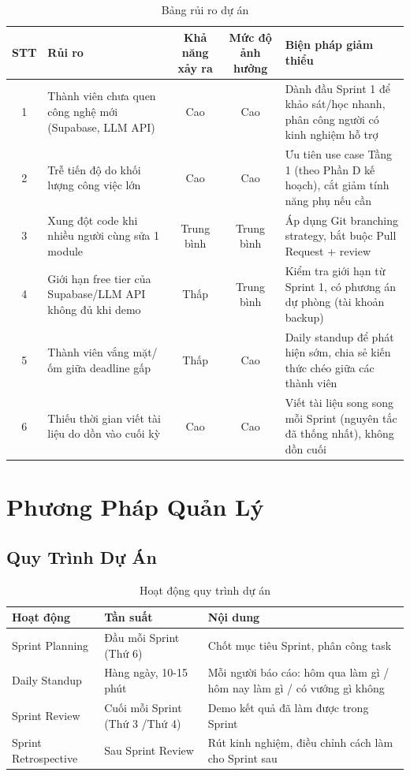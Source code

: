 \begin{table}[H]
  \centering
  \begin{tabularx}{\textwidth}{|c|>{\raggedright\arraybackslash}X|c|c|>{\raggedright\arraybackslash}X|}
    \hline
    \textbf{STT} & \textbf{Rủi ro} & \textbf{Khả năng xảy ra} & \textbf{Mức độ ảnh hưởng} & \textbf{Biện pháp giảm thiểu} \\
    \hline
    1 & Thành viên chưa quen công nghệ mới (Supabase, LLM API) & Cao & Cao & Dành đầu Sprint 1 để khảo sát/học nhanh, phân công người có kinh nghiệm hỗ trợ \\ \hline
    2 & Trễ tiến độ do khối lượng công việc lớn & Cao & Cao & Ưu tiên use case Tầng 1 (theo Phần D kế hoạch), cắt giảm tính năng phụ nếu cần \\ \hline
    3 & Xung đột code khi nhiều người cùng sửa 1 module & Trung bình & Trung bình & Áp dụng Git branching strategy, bắt buộc Pull Request + review \\ \hline
    4 & Giới hạn free tier của Supabase/LLM API không đủ khi demo & Thấp & Trung bình & Kiểm tra giới hạn từ Sprint 1, có phương án dự phòng (tài khoản backup) \\ \hline
    5 & Thành viên vắng mặt/ốm giữa deadline gấp & Thấp & Cao & Daily standup để phát hiện sớm, chia sẻ kiến thức chéo giữa các thành viên \\ \hline
    6 & Thiếu thời gian viết tài liệu do dồn vào cuối kỳ & Cao & Cao & Viết tài liệu song song mỗi Sprint (nguyên tắc đã thống nhất), không dồn cuối \\
    \hline
  \end{tabularx}
  \caption{Bảng rủi ro dự án}
  \label{tab:risks}
\end{table}

\section{Phương Pháp Quản Lý}

\subsection{Quy Trình Dự Án}

\begin{table}[H]
  \centering
  \begin{tabularx}{\textwidth}{|l|l|X|}
    \hline
    \textbf{Hoạt động} & \textbf{Tần suất} & \textbf{Nội dung} \\
    \hline
    Sprint Planning & Đầu mỗi Sprint (Thứ 6) & Chốt mục tiêu Sprint, phân công task \\ \hline
    Daily Standup & Hàng ngày, 10-15 phút & Mỗi người báo cáo: hôm qua làm gì / hôm nay làm gì / có vướng gì không \\ \hline
    Sprint Review & Cuối mỗi Sprint (Thứ 3 /Thứ 4) & Demo kết quả đã làm được trong Sprint \\ \hline
    Sprint Retrospective & Sau Sprint Review & Rút kinh nghiệm, điều chỉnh cách làm cho Sprint sau \\
    \hline
  \end{tabularx}
  \caption{Hoạt động quy trình dự án}
  \label{tab:process_activities}
\end{table}

